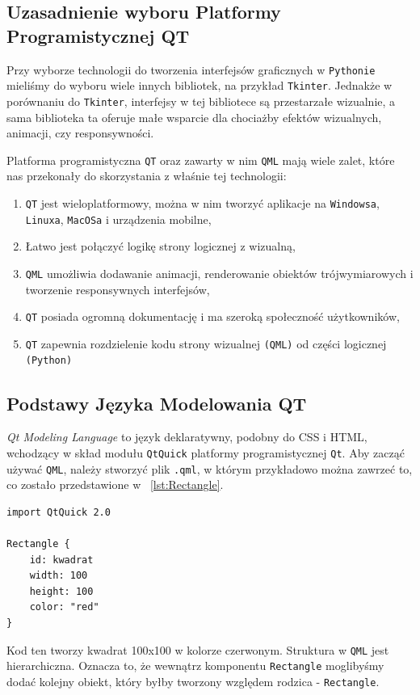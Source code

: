 \subsection{Uzasadnienie wyboru Platformy Programistycznej QT}
\label{sec:UzasadnienieWyboruPlatformyProgramistycznejQT}
Przy wyborze technologii do tworzenia interfejsów graficznych w \texttt{Pythonie} mieliśmy do wyboru wiele innych bibliotek, na przykład \texttt{Tkinter}. 
Jednakże w porównaniu do \texttt{Tkinter}, interfejsy w tej bibliotece są przestarzałe wizualnie, a sama biblioteka ta oferuje małe wsparcie dla chociażby efektów wizualnych, animacji, czy responsywności.

Platforma programistyczna \texttt{QT} oraz zawarty w nim \texttt{QML} mają wiele zalet, które nas przekonały do skorzystania z właśnie tej technologii:
\begin{enumerate}
    \item \texttt{QT} jest wieloplatformowy, można w nim tworzyć aplikacje na \texttt{Windowsa}, \texttt{Linuxa}, \texttt{MacOSa} i urządzenia mobilne,
    \item Łatwo jest połączyć logikę strony logicznej z wizualną,
    \item \texttt{QML} umożliwia dodawanie animacji, renderowanie obiektów trójwymiarowych i tworzenie responsywnych interfejsów,
    \item \texttt{QT} posiada ogromną dokumentację i ma szeroką społeczność użytkowników,
    \item \texttt{QT} zapewnia rozdzielenie kodu strony wizualnej \texttt{(QML)} od części logicznej \texttt{(Python)}
\end{enumerate}

\subsection{Podstawy Języka Modelowania QT} 
\label{sec:PodstawyJezykaModelowaniaQT}
\emph{Qt Modeling Language} to język deklaratywny, podobny do CSS i HTML, wchodzący w skład modułu \texttt{QtQuick} platformy programistycznej \texttt{Qt}. Aby zacząć używać \texttt{QML}, należy stworzyć plik \texttt{.qml}, w którym przykładowo można zawrzeć to, co zostało przedstawione w \lstlistingname{~\ref{lst:Rectangle}}.

\begin{lstlisting}[caption={Przykładowy kod QML}, label={lst:Rectangle}]
import QtQuick 2.0

Rectangle {
    id: kwadrat
    width: 100
    height: 100
    color: "red"
}
\end{lstlisting}
Kod ten tworzy kwadrat 100x100 w kolorze czerwonym. Struktura w \texttt{QML} jest hierarchiczna. Oznacza to, że wewnątrz komponentu \texttt{Rectangle} moglibyśmy dodać kolejny obiekt, który byłby tworzony względem rodzica - \texttt{Rectangle}.

